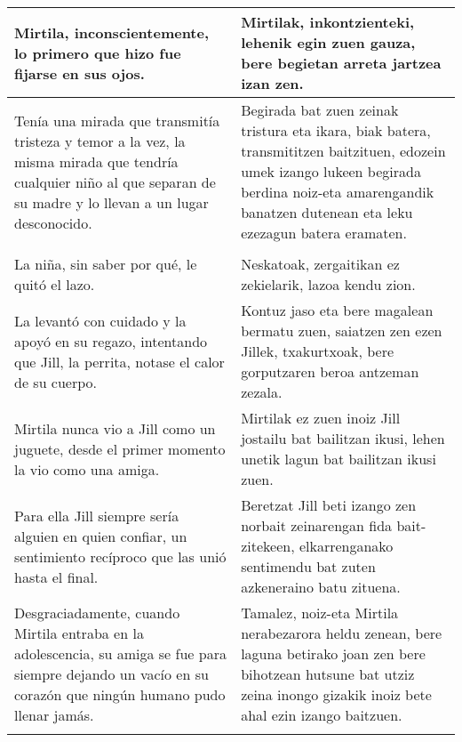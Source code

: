 \documentclass{article}
\begin{document}
\begin{center}
\begin{longtable}{|p{6cm}|p{6cm}|}
  \midrule
  Mirtila, inconscientemente, lo primero que hizo fue fijarse en sus ojos.&
  Mirtilak, inkontzienteki, lehenik egin zuen gauza, bere begietan arreta jartzea izan zen.\\

  \midrule
  Tenía una mirada que transmitía tristeza y temor a la vez, la misma mirada que tendría cualquier niño al que separan de su madre y lo llevan a un lugar desconocido.&
  Begirada bat zuen zeinak tristura eta ikara, biak batera, transmititzen baitzituen, edozein umek izango lukeen begirada berdina noiz-eta amarengandik banatzen dutenean eta leku ezezagun batera eramaten.\\

  \midrule
  \cellcolor{lightgray}{\textbf{Párrafo}} &
  \cellcolor{lightgray}{\textbf{Paragrafoa}}\\
  
  \midrule
  La niña, sin saber por qué, le quitó el lazo.&
  Neskatoak, zergaitikan ez zekielarik, lazoa kendu zion.\\

  \midrule
  La levantó con cuidado y la apoyó en su regazo, intentando que Jill, la perrita, notase el calor de su cuerpo.&
  Kontuz jaso eta bere magalean bermatu zuen, saiatzen zen ezen Jillek, txakurtxoak, bere gorputzaren beroa antzeman zezala.\\

  \midrule
  Mirtila nunca vio a Jill como un juguete, desde el primer momento la vio como una amiga.&
  Mirtilak ez zuen inoiz Jill jostailu bat bailitzan ikusi, lehen unetik lagun bat bailitzan ikusi zuen.\\

  \midrule
  Para ella Jill siempre sería alguien en quien confiar, un sentimiento recíproco que las unió hasta el final.&
  Beretzat Jill beti izango zen norbait zeinarengan fida bait-zitekeen, elkarrenganako sentimendu bat zuten azkeneraino batu zituena.\\  

  \midrule
  Desgraciadamente, cuando Mirtila entraba en la adolescencia, su amiga se fue para siempre dejando un vacío en su corazón que ningún humano pudo llenar jamás.&
  Tamalez, noiz-eta Mirtila nerabezarora heldu zenean, bere laguna betirako joan zen bere bihotzean hutsune bat utziz zeina inongo gizakik inoiz bete ahal ezin izango baitzuen.\\

  \midrule
  \cellcolor{lightgray}{\textbf{Párrafo}} &
  \cellcolor{lightgray}{\textbf{Paragrafoa}}\\
  

\end{longtable}
\end{center}
\end{document}
